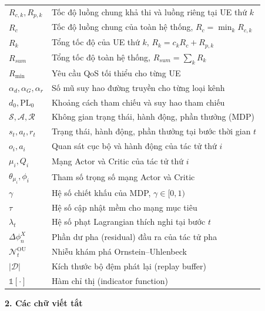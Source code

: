 \begin{longtable}{p{3.5cm} p{11cm}}
$R_{c,k}, R_{p,k}$ & Tốc độ luồng chung khả thi và luồng riêng tại UE thứ $k$ \\
$R_c$ & Tốc độ luồng chung của toàn hệ thống, $R_c = \min_k R_{c,k}$ \\
$R_k$ & Tổng tốc độ của UE thứ $k$, $R_k = c_k R_c + R_{p,k}$ \\
$R_{sum}$ & Tổng tốc độ toàn hệ thống, $R_{sum} = \sum_k R_k$ \\
$R_{\min}$ & Yêu cầu QoS tối thiểu cho từng UE \\
$\alpha_d, \alpha_G, \alpha_r$ & Số mũ suy hao đường truyền cho từng loại kênh \\
$d_0, \mathrm{PL}_0$ & Khoảng cách tham chiếu và suy hao tham chiếu \\
$\mathcal{S}, \mathcal{A}, \mathcal{R}$ & Không gian trạng thái, hành động, phần thưởng (MDP) \\
$s_t, a_t, r_t$ & Trạng thái, hành động, phần thưởng tại bước thời gian $t$ \\
$o_i, a_i$ & Quan sát cục bộ và hành động của tác tử thứ $i$ \\
$\mu_i, Q_i$ & Mạng Actor và Critic của tác tử thứ $i$ \\
$\theta_{\mu_i}, \phi_i$ & Tham số trọng số mạng Actor và Critic \\
$\gamma$ & Hệ số chiết khấu của MDP, $\gamma \in [0,1)$ \\
$\tau$ & Hệ số cập nhật mềm cho mạng mục tiêu \\
$\lambda_t$ & Hệ số phạt Lagrangian thích nghi tại bước $t$ \\
$\Delta\phi_n^X$ & Phần dư pha (residual) đầu ra của tác tử pha \\
$\mathcal{N}_t^{\text{OU}}$ & Nhiễu khám phá Ornstein--Uhlenbeck \\
$|\mathcal{D}|$ & Kích thước bộ đệm phát lại (replay buffer) \\
$\mathds{1}[\cdot]$ & Hàm chỉ thị (indicator function) \\
\bottomrule
\end{longtable}

\vspace{0.4cm}
\noindent\textbf{2. Các chữ viết tắt}\par
\vspace{0.2cm}

